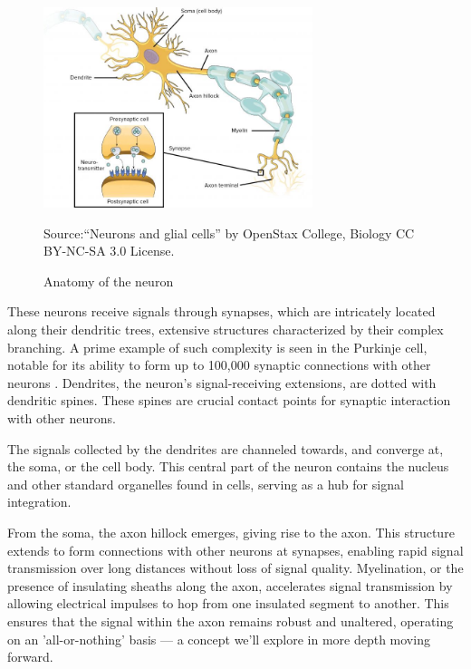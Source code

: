 \documentclass[12pt,a4paper]{report}
\begin{document}
\begin{figure}[H]
    \centering
    \includegraphics[width=0.7\textwidth]{./data/neural.jpg}
    \caption{Anatomy of the neuron}
    \label{fig:my_picture}
    \vspace{1pt} %
    \small{Source:“Neurons and glial cells” by OpenStax College, Biology CC BY-NC-SA 3.0 License.}
\end{figure}

These neurons receive signals through synapses, which are intricately located along their dendritic trees, extensive structures characterized by their complex branching. A prime example of such complexity is seen in the Purkinje cell, notable for its ability to form up to 100,000 synaptic connections with other neurons \cite{MolecularCellBiology}. Dendrites, the neuron's signal-receiving extensions, are dotted with dendritic spines. These spines are crucial contact points for synaptic interaction with other neurons.

The signals collected by the dendrites are channeled towards, and converge at, the soma, or the cell body. This central part of the neuron contains the nucleus and other standard organelles found in cells, serving as a hub for signal integration.

From the soma, the axon hillock emerges, giving rise to the axon. This structure extends to form connections with other neurons at synapses, enabling rapid signal transmission over long distances without loss of signal quality. Myelination, or the presence of insulating sheaths along the axon, accelerates signal transmission by allowing electrical impulses to hop from one insulated segment to another. This ensures that the signal within the axon remains robust and unaltered, operating on an 'all-or-nothing' basis — a concept we'll explore in more depth moving forward.
\end{document}
